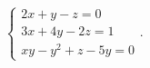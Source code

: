 % 
% 
% 
% 
% 
% 
$\left\{\begin{array}{l}2x+y-z=0\\3x+4y-2z=1\\xy-y^2+z-5y=0\end{array}\right.$.
% 
% 
